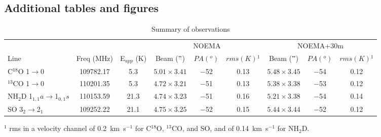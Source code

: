 \documentclass[letter]{aa}
\begin{document}
\begin{appendix}

\section{Additional tables and figures}

\begin{table*}
\caption{Summary of observations}
\label{TableA1}
\begin{tabular}{lc|c|ccc|ccc}
\hline
\hline
\multicolumn{2}{c|}{} & \multicolumn{1}{c|}{} & \multicolumn{3}{c|}{NOEMA}  & \multicolumn{3}{c}{NOEMA+30m} \\ 
Line                       & Freq  (MHz) & E$_{upp}$ (K)  & Beam ($"$) & $PA(^o)$ &  $rms(K)$$^1$ &   Beam ($"$) & $PA(^o)$ &  
$rms(K)$$^1$    \\ \hline
C$^{18}$O 1$\rightarrow$0  &  109782.17  &  5.3    &  $5.01\times3.41$  & $-$52 & 0.13 & $5.48\times3.45$ & $-$54 & 0.12 \\ 
$^{13}$CO 1$\rightarrow$0  &  110201.35  &  5.3       & $4.72\times3.21$  & $-$51 & 0.13 & $5.38\times3.38$ & $-$53 & 0.12 \\ 
NH$_2$D  1$_{1,1}a$$\rightarrow$1$_{0,1}s$ &  110153.59 &   21.3    &$4.74\times3.23$  & $-$51 & 0.16 & $5.21\times3.38$ & $-$54 & 0.14 \\
SO 3$_2$$\rightarrow$2$_1$ &  109252.22  &  21.1  & $4.75\times3.25$  & $-$52 & 0.15 & $5.44\times3.44$ & $-$52 & 0.12 \\
\hline
\hline
\end{tabular}

\noindent
$^1$ rms in a velocity channel of 0.2~km~s$^{-1}$ for C$^{18}$O, $^{13}$CO, and SO, and of 0.14~km~s$^{-1}$ for NH$_2$D.  
\end{table*}



\end{appendix}
\end{document}
